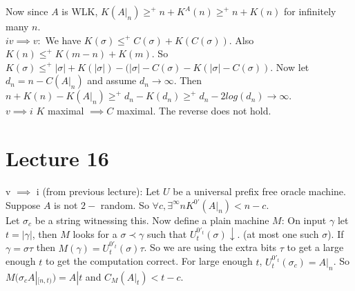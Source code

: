\documentclass{article}
\begin{document}
      Now since $A$ is WLK, $K(A|_n) \geq^+ n + K^A(n) \geq^+ n + K(n)$ for infinitely many $n$.\\
      $iv \implies v:$ We have $K(\sigma) \leq^+ C(\sigma) + K(C(\sigma))$. Also $K(n) \leq^+ K(m-n ) + K(m)$. So $K(\sigma) \leq^+ |\sigma| + K(|\sigma| ) - (|\sigma| - C(\sigma) - K(|\sigma| - C(\sigma))$. Now let $d_n = n-C(A|_n)$ and assume $d_n \to \infty$. Then $n+K(n) -K(A|_n) \geq^+ d_n-K(d_n)\geq^+ d_n - 2log(d_n)\to \infty$.\\
      $v \implies i$ $K$ maximal $ \implies C$ maximal. The reverse does not hold.
      \newpage\section{Lecture 16}
      v $\implies$ i (from previous lecture): Let $U$ be a universal prefix free oracle machine. Suppose $A$ is not $2-$ random. So $\forall c, \exists^\infty n K^{0'}(A|_n)<n-c$. \\
      Let $\sigma_c$ be a string witnessing this. Now define a plain machine $M$: On input $\gamma$ let $t = |\gamma|$, then $M$ looks for a $\sigma \prec \gamma$ such that $U_t^{0'_t}(\sigma) \downarrow$. (at most one such $\sigma$). If $\gamma = \sigma \tau$ then $M(\gamma) = U_t^{0'_t}(\sigma)\tau$. So we are using the extra bits $\tau$ to get a large enough $t$ to get the computation correct. For large enough $t$, $U_t^{0'_t}(\sigma_c) = A|_n$. So $M(\sigma_c A|_{[n,t)}) = A|t$ and $C_M(A|_t) < t-c$. \\
      \\
\end{document}
